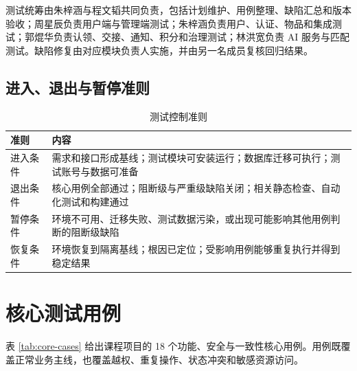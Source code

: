 测试统筹由朱梓涵与程文韬共同负责，包括计划维护、用例整理、缺陷汇总和版本验收；周星辰负责用户端与管理端测试；朱梓涵负责用户、认证、物品和集成测试；郭焜华负责认领、交接、通知、积分和治理测试；林洪宽负责 AI 服务与匹配测试。缺陷修复由对应模块负责人实施，并由另一名成员复核回归结果。

\subsection{进入、退出与暂停准则}

\begin{table}[H]
  \centering
  \caption{测试控制准则}
  \begin{tabularx}{\textwidth}{L{2.5cm}Y}
    \toprule
    准则 & 内容 \\
    \midrule
    进入条件 & 需求和接口形成基线；测试模块可安装运行；数据库迁移可执行；测试账号与数据可准备 \\
    退出条件 & 核心用例全部通过；阻断级与严重级缺陷关闭；相关静态检查、自动化测试和构建通过 \\
    暂停条件 & 环境不可用、迁移失败、测试数据污染，或出现可能影响其他用例判断的阻断级缺陷 \\
    恢复条件 & 环境恢复到隔离基线；根因已定位；受影响用例能够重复执行并得到稳定结果 \\
    \bottomrule
  \end{tabularx}
\end{table}

\section{核心测试用例}

表 \ref{tab:core-cases} 给出课程项目的 18 个功能、安全与一致性核心用例。用例既覆盖正常业务主线，也覆盖越权、重复操作、状态冲突和敏感资源访问。

